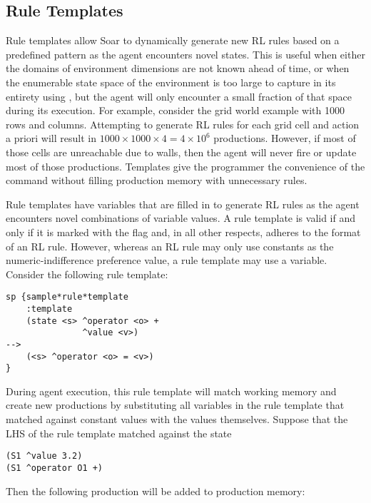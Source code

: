\subsection{Rule Templates}
\label{RL-templates}

Rule templates allow Soar to dynamically generate new RL rules based on a predefined pattern as the agent encounters novel states.
This is useful when either the domains of environment dimensions are not known ahead of time, or when the enumerable state space of the environment is too large to capture in its entirety using , but the agent will only encounter a small fraction of that space during its execution.
For example, consider the grid world example with 1000 rows and columns.
Attempting to generate RL rules for each grid cell and action a priori will result in $1000 \times 1000 \times 4 = 4 \times 10^6$ productions.
However, if most of those cells are unreachable due to walls, then the agent will never fire or update most of those productions.
Templates give the programmer the convenience of the  command without filling production memory with unnecessary rules.

Rule templates have variables that are filled in to generate RL rules as the agent encounters novel combinations of variable values.
A rule template is valid if and only if it is marked with the  flag and, in all other respects, adheres to the format of an RL rule.
However, whereas an RL rule may only use constants as the numeric-indifference preference value, a rule template may use a variable.
Consider the following rule template:

\begin{verbatim}
sp {sample*rule*template
    :template
    (state <s> ^operator <o> +
               ^value <v>)
-->
    (<s> ^operator <o> = <v>)
}
\end{verbatim}

During agent execution, this rule template will match working memory and create new productions by substituting all variables in the rule template that matched against constant values with the values themselves.
Suppose that the LHS of the rule template matched against the state

\begin{verbatim}
(S1 ^value 3.2)
(S1 ^operator O1 +)
\end{verbatim}

Then the following production will be added to production memory:

